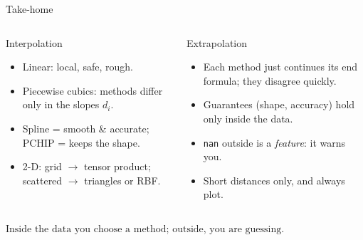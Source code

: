 \documentclass[aspectratio=169]{beamer}
\newcommand{\cbox}[2]{\colorbox{#1}{\ensuremath{\displaystyle #2}}}
\begin{document}
\begin{frame}{Take-home}
\begin{columns}[T]
\begin{column}{0.48\textwidth}
\begin{exampleblock}{Interpolation}
\small
\begin{itemize}
\item Linear: local, safe, rough.
\item Piecewise cubics: methods differ only in the slopes $d_i$.
\item Spline = smooth \& accurate; PCHIP = keeps the shape.
\item 2-D: grid $\to$ tensor product; scattered $\to$ triangles or RBF.
\end{itemize}
\end{exampleblock}
\end{column}
\begin{column}{0.48\textwidth}
\begin{alertblock}{Extrapolation}
\small
\begin{itemize}
\item Each method just continues its end formula; they disagree quickly.
\item Guarantees (shape, accuracy) hold only inside the data.
\item \texttt{nan} outside is a \emph{feature}: it warns you.
\item Short distances only, and always plot.
\end{itemize}
\end{alertblock}
\end{column}
\end{columns}
\vspace{0.8em}
\centering
\cbox{accent!12}{\text{Inside the data you choose a method; outside, you are guessing.}}
\end{frame}
\end{document}
